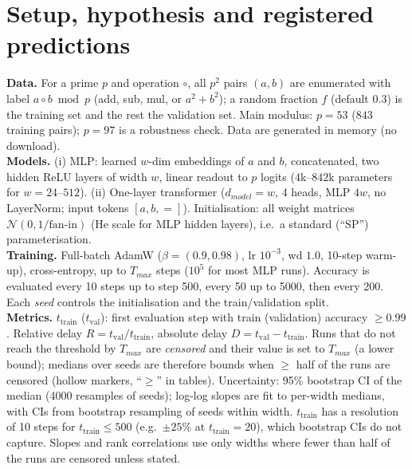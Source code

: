 \documentclass{article}
\newcommand{\ttr}{t_{\mathrm{train}}}
\newcommand{\tva}{t_{\mathrm{val}}}
\begin{document}
\section{Setup, hypothesis and registered predictions}\label{sec:setup}
\textbf{Data.} For a prime $p$ and operation $\circ$, all $p^2$ pairs $(a,b)$ are enumerated with label $a\circ b \bmod p$
(add, sub, mul, or $a^2{+}b^2$); a random fraction $f$ (default $0.3$) is the training set and the rest the validation set. Main modulus: $p{=}53$ ($843$ training pairs);
$p{=}97$ is a robustness check. Data are generated in memory (no download).\\
\textbf{Models.} (i) MLP: learned $w$-dim embeddings of $a$ and $b$, concatenated, two hidden ReLU layers of width $w$, linear readout to $p$ logits ($4$k--$842$k parameters for $w{=}24$--$512$).
(ii) One-layer transformer ($d_{model}{=}w$, 4 heads, MLP $4w$, no LayerNorm; input tokens $[a,b,=]$). Initialisation: all weight matrices $\mathcal N(0,1/\text{fan-in})$ (He scale for MLP hidden layers), i.e.\ a standard (``SP'') parameterisation.\\
\textbf{Training.} Full-batch AdamW ($\beta{=}(0.9,0.98)$, lr $10^{-3}$, wd $1.0$, 10-step warm-up), cross-entropy, up to $T_{max}$ steps ($10^5$ for most MLP runs). Accuracy is evaluated every 10 steps up to step 500, every 50 up to 5000, then every 200.
Each \emph{seed} controls the initialisation and the train/validation split.\\
\textbf{Metrics.} $\ttr$ ($\tva$): first evaluation step with train (validation) accuracy $\ge0.99$. Relative delay $R=\tva/\ttr$, absolute delay $D=\tva-\ttr$.
Runs that do not reach the threshold by $T_{max}$ are \emph{censored} and their value is set to $T_{max}$ (a lower bound); medians over seeds are therefore bounds when $\ge$ half of the runs are censored (hollow markers, ``$\ge$'' in tables).
Uncertainty: 95\% bootstrap CI of the median (4000 resamples of seeds); log-log slopes are fit to per-width medians, with CIs from bootstrap resampling of seeds within width.
$\ttr$ has a resolution of 10 steps for $\ttr\le500$ (e.g.\ $\pm25\%$ at $\ttr{=}20$), which bootstrap CIs do not capture.
Slopes and rank correlations use only widths where fewer than half of the runs are censored unless stated.
\end{document}
